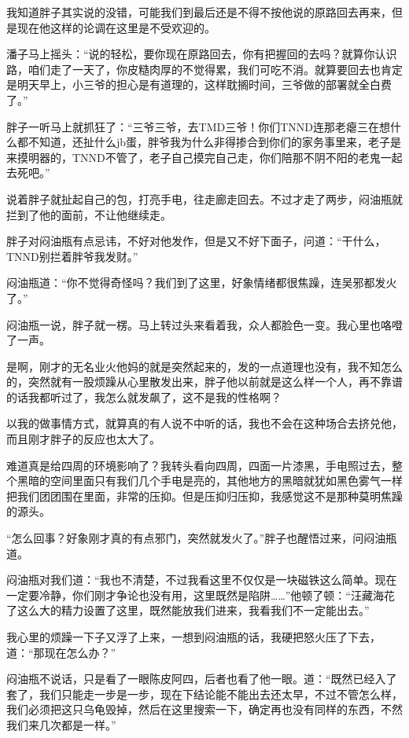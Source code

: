 我知道胖子其实说的没错，可能我们到最后还是不得不按他说的原路回去再来，但是现在他这样的论调在这里是不受欢迎的。

潘子马上摇头：“说的轻松，要你现在原路回去，你有把握回的去吗？就算你认识路，咱们走了一天了，你皮糙肉厚的不觉得累，我们可吃不消。就算要回去也肯定是明天早上，小三爷的担心是有道理的，这样耽搁时间，三爷做的部署就全白费了。”

胖子一听马上就抓狂了：“三爷三爷，去TMD三爷！你们TNND连那老瘪三在想什么都不知道，还扯什么jb蛋，胖爷我为什么非得掺合到你们的家务事里来，老子是来摸明器的，TNND不管了，老子自己摸完自己走，你们陪那不阴不阳的老鬼一起去死吧。”

说着胖子就扯起自己的包，打亮手电，往走廊走回去。不过才走了两步，闷油瓶就拦到了他的面前，不让他继续走。

胖子对闷油瓶有点忌讳，不好对他发作，但是又不好下面子，问道：“干什么，TNND别拦着胖爷我发财。”

闷油瓶道：“你不觉得奇怪吗？我们到了这里，好象情绪都很焦躁，连吴邪都发火了。”

闷油瓶一说，胖子就一楞。马上转过头来看着我，众人都脸色一变。我心里也咯噔了一声。

是啊，刚才的无名业火他妈的就是突然起来的，发的一点道理也没有，我不知怎么的，突然就有一股烦躁从心里散发出来，胖子他以前就是这么样一个人，再不靠谱的话我都听过了，我怎么就发飙了，这不是我的性格啊？

以我的做事情方式，就算真的有人说不中听的话，我也不会在这种场合去挤兑他，而且刚才胖子的反应也太大了。

难道真是给四周的环境影响了？我转头看向四周，四面一片漆黑，手电照过去，整个黑暗的空间里面只有我们几个手电是亮的，其他地方的黑暗就犹如黑色雾气一样把我们团团围在里面，非常的压抑。但是压抑归压抑，我感觉这不是那种莫明焦躁的源头。

“怎么回事？好象刚才真的有点邪门，突然就发火了。”胖子也醒悟过来，问闷油瓶道。

闷油瓶对我们道：“我也不清楚，不过我看这里不仅仅是一块磁铁这么简单。现在一定要冷静，你们刚才争论也没有用，这里既然是陷阱……”他顿了顿：“汪藏海花了这么大的精力设置了这里，既然能放我们进来，我看我们不一定能出去。”

我心里的烦躁一下子又浮了上来，一想到闷油瓶的话，我硬把怒火压了下去，道：“那现在怎么办？”

闷油瓶不说话，只是看了一眼陈皮阿四，后者也看了他一眼。道：“既然已经入了套了，我们只能走一步是一步，现在下结论能不能出去还太早，不过不管怎么样，我们必须把这只乌龟毁掉，然后在这里搜索一下，确定再也没有同样的东西，不然我们来几次都是一样。”

